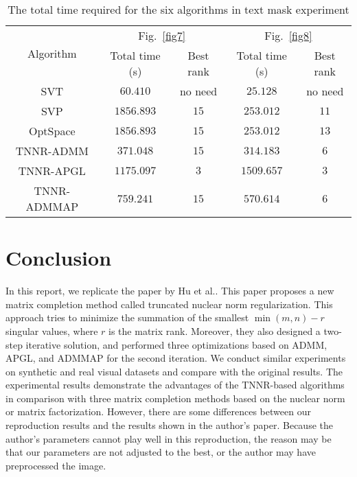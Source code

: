 \documentclass[fontset=windows]{article}
\begin{document}
{\begin{table}
    \caption{The total time required for the six algorithms in text mask experiment}
    \label{t3}
    \centering
    \renewcommand{\arraystretch}{1.25} 
    \begin{tabular}{ccccc}
        \toprule
        \multirow{2}{*}{Algorithm}  & \multicolumn{2}{c}{Fig.~\ref{fig7}} & \multicolumn{2}{c}{Fig.~\ref{fig8}} \\
        \cmidrule(r){2-3} \cmidrule(r){4-5} 
        & Total time (s) & Best rank & Total time (s) & Best rank \\
        \midrule
        SVT & $60.410$ & no need &   $25.128$ &  no need \\
        SVP & $1856.893$ & $15$ & $253.012$ & $11$ \\
        OptSpace & $1856.893$ & $15$ & $253.012$ & $13$ \\
        TNNR-ADMM &  $371.048$ & $15$ & $314.183$ & $6$\\
        TNNR-APGL & $1175.097$ & $3$ & $1509.657$ & $3$\\
        TNNR-ADMMAP & $759.241$ & $15$ & $570.614$ & $6$\\
         \bottomrule
    \end{tabular}
\end{table}

\section{Conclusion}
\label{s5}
In this report, we replicate the paper by Hu et al.\cite{hu.he201309}. This paper proposes a new matrix completion method called truncated nuclear
norm regularization. This approach tries to minimize the summation of the smallest $\min (m,n)-r$ singular values, where $r$ is the matrix rank. 
Moreover, they also designed a two-step iterative solution, and performed three optimizations based on ADMM, APGL, and ADMMAP for the second iteration. We conduct similar experiments on synthetic and real visual datasets and compare with the original results. The experimental results demonstrate the advantages of the TNNR-based algorithms in comparison with
three matrix completion methods based on the nuclear norm or matrix factorization. However, there are some differences between our reproduction results and the results shown in the author's paper. Because the author's parameters cannot play well in this reproduction, the reason may be that our parameters are not adjusted to the best, or the author may have preprocessed the image.

}
\end{document}
